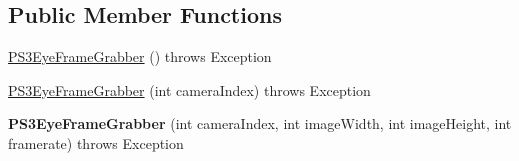 \subsection*{Public Member Functions}
\begin{DoxyCompactItemize}
\item 
\hyperlink{classairhockeyjava_1_1detection_1_1_p_s3_eye_frame_grabber_a1e9433e8f5abc8fcd50ee355d24d808d}{P\+S3\+Eye\+Frame\+Grabber} ()  throws Exception 
\item 
\hyperlink{classairhockeyjava_1_1detection_1_1_p_s3_eye_frame_grabber_a2bb1256408987d2af96d62721170eee4}{P\+S3\+Eye\+Frame\+Grabber} (int camera\+Index)  throws Exception 
\item 
\hypertarget{classairhockeyjava_1_1detection_1_1_p_s3_eye_frame_grabber_a4475324a489ade51a7914e94999acfa8}{}{\bfseries P\+S3\+Eye\+Frame\+Grabber} (int camera\+Index, int image\+Width, int image\+Height, int framerate)  throws Exception \label{classairhockeyjava_1_1detection_1_1_p_s3_eye_frame_grabber_a4475324a489ade51a7914e94999acfa8}


\end{DoxyCompactItemize}
